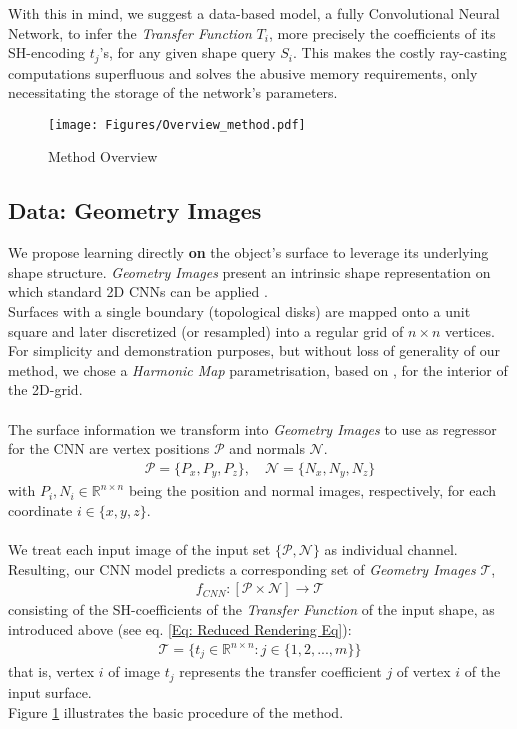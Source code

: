 With this in mind, we suggest a data-based model, a fully Convolutional Neural Network, to infer the \textit{Transfer Function} $T_i$, more precisely the coefficients of its SH-encoding $t_j$'s, for any given shape query $S_i$.
This makes the costly ray-casting computations superfluous and solves the abusive memory requirements, only necessitating the storage of the network's parameters. 
\begin{figure}[H]
  \centering
    \texttt{[image: Figures/Overview\_method.pdf]}
     \caption{Method Overview}
     \label{Fig: Method_Overview}
\end{figure}
\subsection{Data: Geometry Images}
We propose learning directly \textbf{on} the object's surface to leverage its underlying shape structure. \textit{Geometry Images} present an intrinsic shape representation on which standard 2D CNNs can be applied \cite{gu2002geometry, sinha2016deep}. 
\\ 
Surfaces with a single boundary (topological disks) are mapped onto a unit square and later discretized (or resampled) into a regular grid of $n \times n$ vertices. 
For simplicity and demonstration purposes, but without loss of generality of our method, we  chose a \textit{Harmonic Map} parametrisation, based on \cite{HarmonicMapping}, for the interior of the 2D-grid. 
\\
\\
The surface information we transform into \textit{Geometry Images} to use as regressor for the CNN are vertex positions $\mathcal{P}$ and normals $\mathcal{N}$. 
\begin{align*}
	\mathcal{P} = \{ P_x, P_y, P_z \} , \quad
	\mathcal{N} = \{ N_x, N_y, N_z \}  
\end{align*}
with  $P_i, N_i \in \mathbb{R}^{n \times n }$ being the position and normal images, respectively, for each coordinate $i \in \{ x,y,z\}$.
\\
\\
We treat each input image of the input set $\{\mathcal{P}, \mathcal{N} \}$ as individual channel. Resulting, our CNN model predicts a corresponding set of \textit{Geometry Images} $\mathcal{T}$,
\begin{align*}
	f_{CNN} :  [\mathcal{P} \times \mathcal{N}] \rightarrow \mathcal{T} 
\end{align*}
consisting of the SH-coefficients of the \textit{Transfer Function} of the input shape, as introduced above (see eq. \ref{Eq: Reduced Rendering Eq}):
\begin{align*}
	\mathcal{T} = \{ t_j \in \mathbb{R}^{n \times n } : j \in \{1,2,...,m\}\} 
\end{align*}
that is, vertex $i$ of image $t_j$ represents the transfer coefficient $j$ of vertex $i$ of the input surface.
\\
Figure \ref{Fig: Method_Overview} illustrates the basic procedure of the method.

